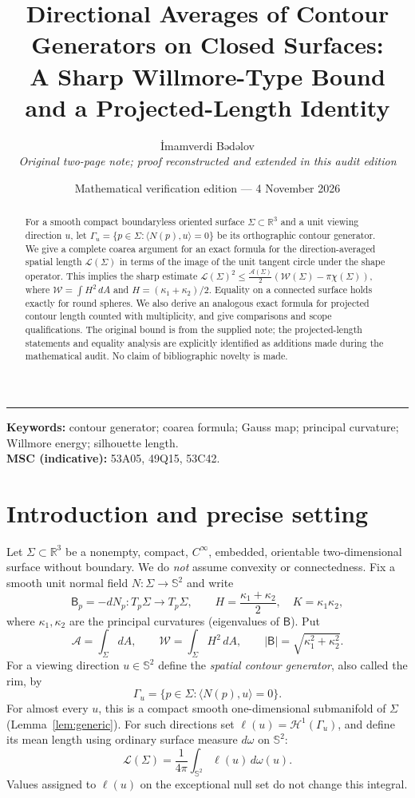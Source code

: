 \documentclass[10pt,a4paper]{article}
\title{\vspace{-12mm}\bfseries\Large Directional Averages of Contour Generators on Closed Surfaces:\\[4pt]
A Sharp Willmore-Type Bound and a Projected-Length Identity}
\author{\large İmamverdi Bədəlov\\[-2pt]
\small\itshape Original two-page note; proof reconstructed and extended in this audit edition}
\date{\small Mathematical verification edition --- 4 November 2026}
\theoremstyle{remark}\newtheorem{remark}[theorem]{Remark}
\newcommand{\Sph}{\mathbb S^2}
\newcommand{\HH}{\mathcal H}
\newcommand{\A}{\mathcal A}
\newcommand{\W}{\mathcal W}
\newcommand{\Lc}{\mathcal L}
\newcommand{\Bop}{\mathsf B}
\begin{document}
\maketitle
\vspace{-8mm}
\begin{center}\rule{0.96\linewidth}{0.5pt}\end{center}
\begin{abstract}\noindent
For a smooth compact boundaryless oriented surface $\Sigma\subset\mathbb R^3$ and a unit viewing direction $u$, let $\Gamma_u=\{p\in\Sigma:\langle N(p),u\rangle=0\}$ be its orthographic contour generator. We give a complete coarea argument for an exact formula for the direction-averaged spatial length $\Lc(\Sigma)$ in terms of the image of the unit tangent circle under the shape operator. This implies the sharp estimate
$\Lc(\Sigma)^2\le \frac{\A(\Sigma)}2(\W(\Sigma)-\pi\chi(\Sigma))$, where $\W=\int H^2\,dA$ and $H=(\kappa_1+\kappa_2)/2$. Equality on a connected surface holds exactly for round spheres. We also derive an analogous exact formula for projected contour length counted with multiplicity, and give comparisons and scope qualifications. The original bound is from the supplied note; the projected-length statements and equality analysis are explicitly identified as additions made during the mathematical audit. No claim of bibliographic novelty is made.
\end{abstract}
\noindent\textbf{Keywords:} contour generator; coarea formula; Gauss map; principal curvature; Willmore energy; silhouette length.\\[-2pt]
\textbf{MSC (indicative):} 53A05, 49Q15, 53C42.

\section{Introduction and precise setting}
Let $\Sigma\subset\mathbb R^3$ be a nonempty, compact, $C^\infty$, embedded, orientable two-dimensional surface without boundary. We do \emph{not} assume convexity or connectedness. Fix a smooth unit normal field $N:\Sigma\to\Sph$ and write
\[
\Bop_p=-dN_p:T_p\Sigma\longrightarrow T_p\Sigma,
\qquad H=\frac{\kappa_1+\kappa_2}{2},\quad K=\kappa_1\kappa_2,
\]
where $\kappa_1,\kappa_2$ are the principal curvatures (eigenvalues of $\Bop$). Put
\[
\A=\int_\Sigma dA,\qquad
\W=\int_\Sigma H^2\,dA,\qquad
|\Bop|=\sqrt{\kappa_1^2+\kappa_2^2}.
\]
For a viewing direction $u\in\Sph$ define the \emph{spatial contour generator}, also called the rim, by
\[
\Gamma_u=\{p\in\Sigma:\langle N(p),u\rangle=0\}.
\]
For almost every $u$, this is a compact smooth one-dimensional submanifold of $\Sigma$ (Lemma~\ref{lem:generic}). For such directions set $\ell(u)=\HH^1(\Gamma_u)$, and define its mean length using ordinary surface measure $d\omega$ on $\Sph$:
\begin{equation}\label{eq:Ldef}
\Lc(\Sigma)=\frac1{4\pi}\int_{\Sph}\ell(u)\,d\omega(u).
\end{equation}
Values assigned to $\ell(u)$ on the exceptional null set do not change this integral.
\end{document}
